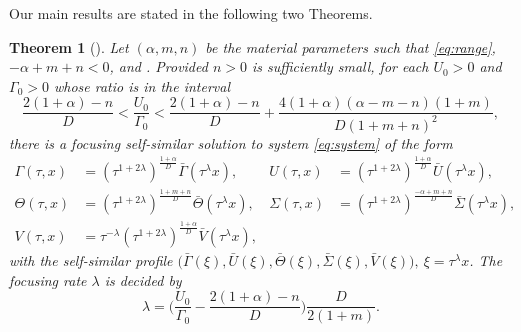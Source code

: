 \documentclass[a4paper,11pt]{article}
\def\bG{{\bar{\Gamma}}}
\def\bV{{\bar{V}}}
\def\bTh{{\bar{\Theta}}}
\def\bS{{\bar{\Sigma}}}
\def\bU{{\bar{U}}}
\newtheorem{theorem}{Theorem}
\theoremstyle{remark}
\begin{document}
Our main results are stated in the following two Theorems.
\begin{theorem}[\cite{KLT17}] \label{mainthm1}
Let $(\alpha, m, n)$ be the material parameters such that \eqref{eq:range}, $-\alpha+m+n<0$,  and . Provided $n>0$ is sufficiently small, for each $U_0>0$ and $\Gamma_0>0$ whose ratio is in the interval
\begin{equation} \label{eq:restriction}
 \frac{2(1+\alpha) -n}{D} < \frac{U _0}{\Gamma _0} < \frac{2(1+\alpha) -n}{D} + \frac{4(1+\alpha)(\alpha-m-n)(1+m)}{D(1+m+n)^2},
\end{equation}
there is a focusing self-similar solution to system \eqref{eq:system} of the form
\begin{align*}
 \Gamma (\tau,x) &= \left(\tau^{1+ 2 \lambda}\right) ^{ \frac{1+ \alpha}{D}} \bG(\tau ^\lambda x), & U (\tau,x) &=\left(\tau^{1+ 2 \lambda}\right) ^{ \frac{1+ \alpha}{D}} \bU( \tau ^\lambda x),\\
 \Theta (\tau,x) &= \left(\tau^{1+ 2 \lambda}\right) ^{ \frac{1+ m +n}{D}} \bTh( \tau ^\lambda x), & \Sigma (\tau,x) &= \left(\tau^{1+ 2 \lambda}\right) ^{ \frac{- \alpha +m+n}{D}} \bS( \tau ^\lambda x),\\
 V (\tau,x) &= \tau ^{-\lambda} \left(\tau^{1+ 2 \lambda}\right) ^{ \frac{1+ \alpha}{D}} \bV( \tau ^\lambda x), 
\end{align*}
with the self-similar profile $\big(\bG(\xi), \bU(\xi), \bTh(\xi),\bS(\xi),\bV(\xi)\big), \ \xi = \tau^\lambda x$. The focusing rate $\lambda$ is decided by
\begin{equation} \label{eq:lambda}
 \lambda = \Big(\frac{U _0}{\Gamma _0} - \frac{2(1+\alpha)-n}{D}\Big)\frac{D}{2(1+m)}.
\end{equation}

\end{theorem}
\end{document}
